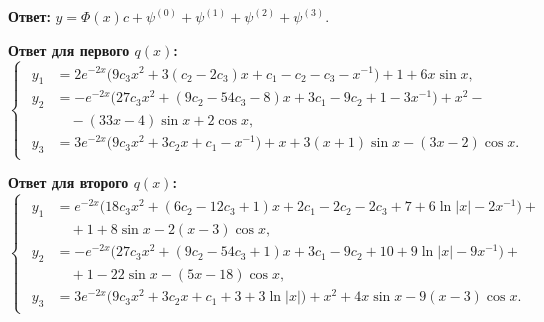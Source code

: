 \documentclass[11pt]{article}
\begin{document}
{%

\bigskip
\textbf{Ответ:}
$y=\Phi(x)c + \psi^{(0)} + \psi^{(1)} + \psi^{(2)} + \psi^{(3)}.$

\bigskip
\textbf{Ответ для первого $q(x)$:}
\begin{equation*}
\begin{cases}
\begin{aligned}
y_1 &= 2e^{-2x} \big( 9c_3 x^2 + 3(c_2 - 2c_3)x + c_1 - c_2 - c_3 - x^{-1} \big) + 1 + 6x\sin x, \\
y_2 &= -e^{-2x} \big( 27c_3 x^2 + (9c_2 - 54c_3 - 8)x + 3c_1 - 9c_2 + 1 - 3x^{-1} \big) + x^2 - \\
& \quad - (33x-4)\sin x + 2\cos x, \\
y_3 &= 3e^{-2x} \big( 9c_3 x^2 + 3c_2x + c_1 - x^{-1} \big) + x + 3(x+1)\sin x - (3x-2) \cos x .
\end{aligned}
\end{cases}
\end{equation*}

\textbf{Ответ для второго $q(x)$:}
\begin{equation*}
\begin{cases}
\begin{aligned}
y_1 &= e^{-2x} \big( 18c_3 x^2 + (6c_2 - 12c_3 + 1)x + 2c_1 - 2c_2 - 2c_3 + 7 + 6 \ln|x| - 2x^{-1} \big) + \\
& \quad + 1 + 8\sin x - 2(x-3) \cos x, \\
y_2 &= -e^{-2x} \big( 27c_3x^2 + (9c_2 - 54c_3 + 1)x + 3c_1 - 9c_2 + 10 + 9\ln|x| - 9x^{-1} \big) + \\
& \quad + 1 - 22\sin x - (5x - 18)\cos x, \\
y_3 &= 3e^{-2x} \big( 9c_3 x^2 + 3c_2 x + c_1 + 3 + 3\ln|x| \big) + x^2 +4x\sin x - 9(x-3)\cos x.
\end{aligned}
\end{cases}
\end{equation*}

}
\end{document}
